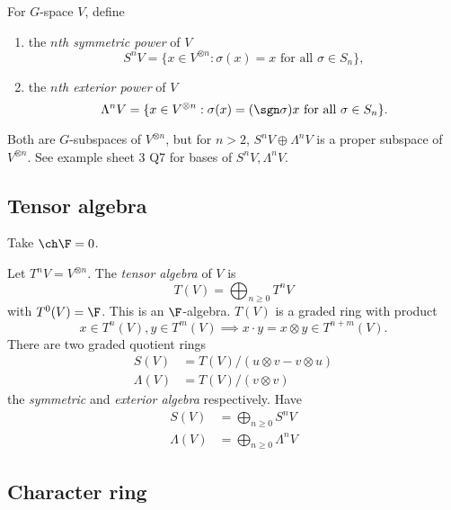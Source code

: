 \documentclass[a4paper]{article}
\theoremstyle{definition}
\begin{document}
\begin{definition}
  For \(G\)-space \(V\), define
  \begin{enumerate}
  \item the \emph{\(n\)th symmetric power} of \(V\)
    \[
      S^nV = \{x \in V^{\otimes n}: \sigma(x) = x \text{ for all } \sigma \in S_n\},
    \]
  \item the \emph{\(n\)th exterior power} of \(V\)
    \[
      \Lambda^n V = \{x \in V^{\otimes n}: \sigma(x) = (\sgn \sigma) x \text{ for all } \sigma \in S_n\}.
    \]
  \end{enumerate}
\end{definition}
Both are \(G\)-subspaces of \(V^{\otimes n}\), but for \(n > 2\), \(S^n V \oplus \Lambda^nV\) is a proper subspace of \(V^{\otimes n}\). See example sheet 3 Q7 for bases of \(S^nV, \Lambda^nV\).

\subsection{Tensor algebra}

Take \(\ch \F = 0\).

\begin{definition}
  Let \(T^nV = V^{\otimes n}\). The \emph{tensor algebra} of \(V\) is
  \[
    T(V) = \bigoplus_{n \geq 0} T^nV
  \]
  with \(T^0(V) = \F\). This is an \(\F\)-algebra. \(T(V)\) is a graded ring with product
  \[
    x \in T^n(V), y \in T^m(V) \implies x \cdot y = x \otimes y \in T^{n + m}(V).
  \]
  There are two graded quotient rings
  \begin{align*}
    S(V) &= T(V)/(u \otimes v - v \otimes u) \\
    \Lambda(V) &= T(V)/(v \otimes v)
  \end{align*}
  the \emph{symmetric} and \emph{exterior algebra} respectively. Have
  \begin{align*}
    S(V) &= \bigoplus_{n \geq 0} S^n V \\
    \Lambda(V) &= \bigoplus_{n \geq 0} \Lambda^n V
  \end{align*}
\end{definition}

\subsection{Character ring}
\end{document}
